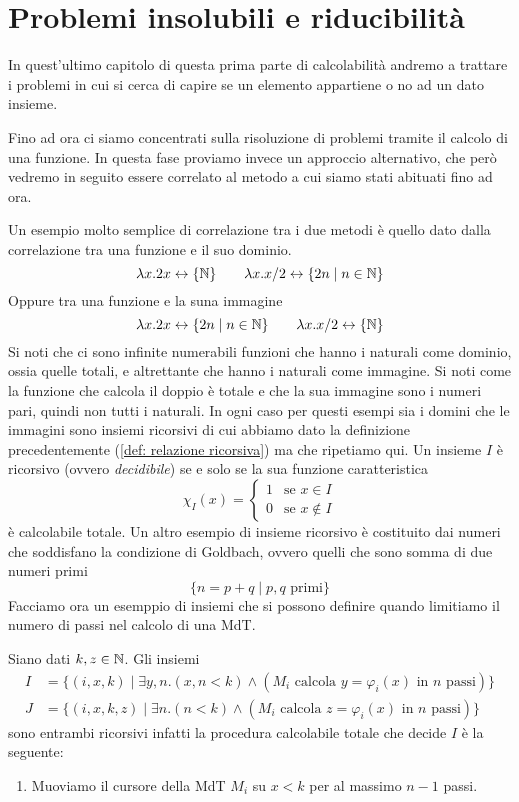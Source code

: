 \chapter{Problemi insolubili e riducibilità}
In quest'ultimo capitolo di questa prima parte di calcolabilità
andremo a trattare i problemi in cui si cerca di capire se un
elemento appartiene o no ad un dato insieme.

Fino ad ora ci siamo concentrati sulla risoluzione di problemi
tramite il calcolo di una funzione. In questa fase proviamo
invece un approccio alternativo, che però vedremo in seguito
essere correlato al metodo a cui siamo stati abituati fino ad
ora.

Un esempio molto semplice di correlazione tra i due metodi è
quello dato dalla correlazione tra una funzione e il suo dominio.
\[
	\lambda x . 2 x \leftrightarrow \{ \mathbb{N} \} \qquad
	\lambda x . x / 2 \leftrightarrow \{ 2n \mid n \in \mathbb{N} \}
\]
Oppure tra una funzione e la suna immagine
\[
	\lambda x . 2 x \leftrightarrow \{ 2 n \mid n \in \mathbb{N} \}
	\qquad \lambda x . x / 2 \leftrightarrow \{ \mathbb{N} \}
\]
Si noti che ci sono infinite numerabili funzioni che hanno i
naturali come dominio, ossia quelle totali, e altrettante che
hanno i naturali come immagine. Si noti come la funzione che
calcola il doppio è totale e che la sua immagine sono i numeri
pari, quindi non tutti i naturali. In ogni caso per questi
esempi sia i domini che le immagini sono insiemi ricorsivi
di cui abbiamo dato la definizione precedentemente
(\ref{def: relazione ricorsiva}) ma che ripetiamo qui. Un
insieme $I$ è ricorsivo (ovvero \emph{decidibile}) se e solo se
la sua funzione caratteristica
\[
	\chi_I (x) = \begin{cases}
		1 & \text{se } x \in I    \\
		0 & \text{se } x \notin I
	\end{cases}
\]
è calcolabile totale. Un altro esempio di insieme ricorsivo è
costituito dai numeri che soddisfano la condizione di Goldbach,
ovvero quelli che sono somma di due numeri primi
\[ \{ n = p + q \mid p, q \text{ primi} \} \]
Facciamo ora un esemppio di insiemi che si possono definire
quando limitiamo il numero di passi nel calcolo di una MdT.

\begin{example}
	Siano dati $k, z \in \mathbb{N}$. Gli insiemi
	\begin{align*}
		I & = \{ (i, x, k) \mid \exists y, n . (x,n < k)
		\land (M_i \text{ calcola } y = \varphi_i (x)
		\text{ in } n \text{ passi}) \}                  \\
		J & = \{ (i,x,k,z) \mid \exists n . (n < k)
		\land (M_i \text{ calcola } z = \varphi_i (x)
		\text{ in } n \text{ passi}) \}
	\end{align*}
	sono entrambi ricorsivi infatti la procedura calcolabile
	totale che decide $I$ è la seguente:
	\begin{enumerate}
		\item Muoviamo il cursore della MdT $M_i$ su $x < k$
		      per al massimo $n-1$ passi.
	\end{enumerate}
\end{example}
